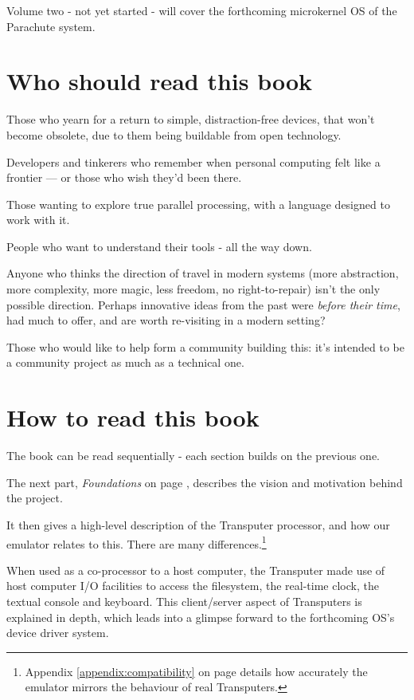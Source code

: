 \documentclass[a4paper]{tufte-book}
\begin{document}
	Volume two - not yet started - will cover the forthcoming microkernel OS of the Parachute system.

\section{Who should read this book}

Those who yearn for a return to simple, distraction-free devices, that won't become obsolete, due to them being buildable from open technology.

Developers and tinkerers who remember when personal computing felt like a frontier — or those who wish they'd been there.

Those wanting to explore true parallel processing, with a language designed to work with it.

People who want to understand their tools - all the way down.

Anyone who thinks the direction of travel in modern systems (more abstraction, more complexity, more magic, less freedom, no right-to-repair) isn't the only possible direction. Perhaps innovative ideas from the past were \textit{before their time}, had much to offer, and are worth re-visiting in a modern setting?

Those who would like to help form a community building this: it's intended to be a community project as much as a technical one. 


\section{How to read this book}
The book can be read sequentially - each section builds on the previous one.

The next part, \textit{Foundations} on page \pageref{foundations}, describes the vision and motivation behind the project. 

It then gives a high-level description of the Transputer processor, and how our emulator relates to this. There are many differences.\footnote{Appendix \ref{appendix:compatibility} on page \pageref{appendix:compatibility} details how accurately the emulator mirrors the behaviour of real Transputers.}

When used as a co-processor to a host computer, the Transputer made use of host computer I/O facilities to access the filesystem, the real-time clock, the textual console and keyboard. This client/server aspect of Transputers is explained in depth, which leads into a glimpse forward to the forthcoming OS's device driver system.
\end{document}
